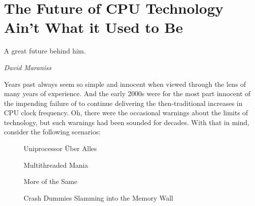 
\section{The Future of CPU Technology Ain't What it Used to Be}
\label{sec:future:The Future of CPU Technology Ain't What it Used to Be}
%
\epigraph{A great future behind him.}{\emph{David Maraniss}}

Years past always seem so simple and innocent when viewed through the
lens of many years of experience.
And the early 2000s were for the most part innocent of the impending
failure of  to continue delivering the then-traditional
increases in CPU clock frequency.
Oh, there were the occasional warnings about the limits of technology,
but such warnings had been sounded for decades.
With that in mind, consider the following scenarios:

\begin{figure}
\centering
{}
\caption{Uniprocessor \"Uber Alles}
\end{figure}

\begin{figure}
\centering
{}
\caption{Multithreaded Mania}
\end{figure}

\begin{figure}
\centering
{}
\caption{More of the Same}
\end{figure}

\begin{figure}
\centering
{}
\caption{Crash Dummies Slamming into the Memory Wall}
\end{figure}

